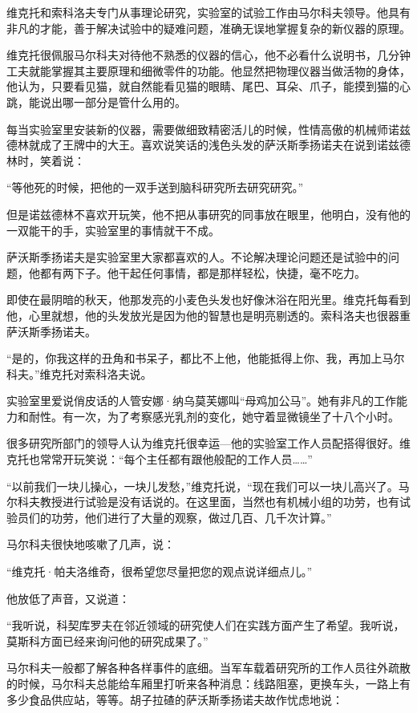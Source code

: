 维克托和索科洛夫专门从事理论研究，实验室的试验工作由马尔科夫领导。他具有非凡的才能，善于解决试验中的疑难问题，准确无误地掌握复杂的新仪器的原理。

维克托很佩服马尔科夫对待他不熟悉的仪器的信心，他不必看什么说明书，几分钟工夫就能掌握其主要原理和细微零件的功能。他显然把物理仪器当做活物的身体，他认为，只要看见猫，就自然能看见猫的眼睛、尾巴、耳朵、爪子，能摸到猫的心跳，能说出哪一部分是管什么用的。

每当实验室里安装新的仪器，需要做细致精密活儿的时候，性情高傲的机械师诺兹德林就成了王牌中的大王。喜欢说笑话的浅色头发的萨沃斯季扬诺夫在说到诺兹德林时，笑着说：

“等他死的时候，把他的一双手送到脑科研究所去研究研究。”

但是诺兹德林不喜欢开玩笑，他不把从事研究的同事放在眼里，他明白，没有他的一双能干的手，实验室里的事情就干不成。

萨沃斯季扬诺夫是实验室里大家都喜欢的人。不论解决理论问题还是试验中的问题，他都有两下子。他干起任何事情，都是那样轻松，快捷，毫不吃力。

即使在最阴暗的秋天，他那发亮的小麦色头发也好像沐浴在阳光里。维克托每看到他，心里就想，他的头发放光是因为他的智慧也是明亮剔透的。索科洛夫也很器重萨沃斯季扬诺夫。

“是的，你我这样的丑角和书呆子，都比不上他，他能抵得上你、我，再加上马尔科夫。”维克托对索科洛夫说。

实验室里爱说俏皮话的人管安娜·纳乌莫芙娜叫“母鸡加公马”。她有非凡的工作能力和耐性。有一次，为了考察感光乳剂的变化，她守着显微镜坐了十八个小时。

很多研究所部门的领导人认为维克托很幸运—他的实验室工作人员配搭得很好。维克托也常常开玩笑说：“每个主任都有跟他般配的工作人员……”

“以前我们一块儿操心，一块儿发愁，”维克托说，“现在我们可以一块儿高兴了。马尔科夫教授进行试验是没有话说的。在这里面，当然也有机械小组的功劳，也有试验员们的功劳，他们进行了大量的观察，做过几百、几千次计算。”

马尔科夫很快地咳嗽了几声，说：

“维克托·帕夫洛维奇，很希望您尽量把您的观点说详细点儿。”

他放低了声音，又说道：

“我听说，科契库罗夫在邻近领域的研究使人们在实践方面产生了希望。我听说，莫斯科方面已经来询问他的研究成果了。”

马尔科夫一般都了解各种各样事件的底细。当军车载着研究所的工作人员往外疏散的时候，马尔科夫总能给车厢里打听来各种消息：线路阻塞，更换车头，一路上有多少食品供应站，等等。胡子拉碴的萨沃斯季扬诺夫故作忧虑地说：

